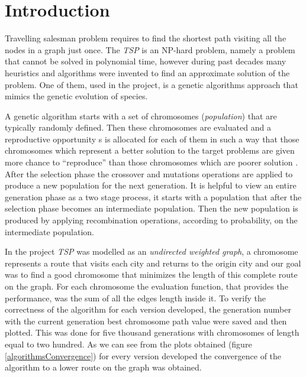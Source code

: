 \section{Introduction}

Travelling salesman problem requires to find the shortest path visiting all the nodes in a graph just once. The \textit{TSP} is an NP-hard problem, namely a problem that cannot be solved in polynomial time, however during past decades many heuristics and algorithms were invented to find an approximate solution of the problem. One of them, used in the project, is a genetic algorithms approach that mimics the genetic evolution of species. 

A genetic algorithm starts with a set of chromosomes (\textit{population}) that are typically randomly defined. Then these chromosomes are evaluated and a reproductive opportunity s is allocated for each of them in such a way that those chromosomes which represent a better solution to the target problems are given more chance to ``reproduce'' than those chromosomes which are poorer solution \cite{genetic-algorithm-tutorial}. After the selection phase the crossover and mutations operations are applied to produce a new population for the next generation. It is helpful to view an entire generation phase as a two stage process, it starts with a population that after the selection phase becomes an intermediate population. Then the new population is produced by applying recombination operations, according to probability, on the intermediate population. 

In the project \textit{TSP} was modelled as an \textit{undirected weighted graph}, a chromosome represents a route that visits each city and returns to the origin city and our goal was to find a good chromosome that minimizes the length of this complete route on the graph. For each chromosome the evaluation function, that provides the performance, was the sum of all the edges length inside it. To verify the correctness of the algorithm for each version developed, the generation number with the current generation best chromosome path value were saved and then plotted. This was done for five thousand generations with chromosomes of length equal to two hundred. As we can see from the plots obtained (figure  \ref{algorithmsConvergence}) for every version developed the convergence of the algorithm to a lower route on the graph was obtained. 
\vspace{0.6em}

